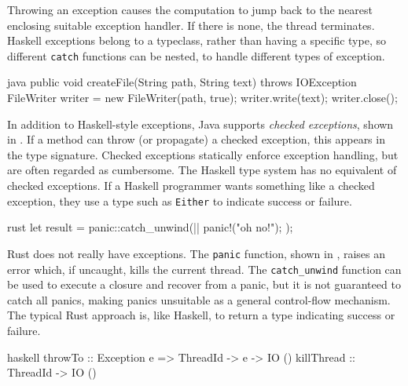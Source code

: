 Throwing an exception causes the computation to jump back to the
nearest enclosing suitable exception handler.  If there is none, the
thread terminates.  Haskell exceptions belong to a typeclass, rather
than having a specific type, so different \verb|catch| functions can
be nested, to handle different types of exception.

\begin{listing}
\centering
\begin{cminted}{java}
public void createFile(String path, String text) throws IOException {
  FileWriter writer = new FileWriter(path, true);
  writer.write(text);
  writer.close();
}
\end{cminted}
\caption{Checked exceptions in Java.}\label{lst:excs_java}
\end{listing}

In addition to Haskell-style exceptions, Java supports \emph{checked
  exceptions}, shown in .  If a method can throw
(or propagate) a checked exception, this appears in the type
signature.  Checked exceptions statically enforce exception handling,
but are often regarded as cumbersome.  The Haskell type system has no
equivalent of checked exceptions.  If a Haskell programmer wants
something like a checked exception, they use a type such as
\verb|Either| to indicate success or failure.

\begin{listing}
\centering
\begin{cminted}{rust}
let result = panic::catch_unwind(|| {
    panic!("oh no!");
});
\end{cminted}
\caption{Panics in Rust.}\label{lst:excs_rust}
\end{listing}

Rust does not really have exceptions.  The \verb|panic| function,
shown in , raises an error which, if uncaught,
kills the current thread.  The \verb|catch_unwind| function can be
used to execute a closure and recover from a panic, but it is not
guaranteed to catch all panics\cite{rust2018}, making panics
unsuitable as a general control-flow mechanism.  The typical Rust
approach is, like Haskell, to return a type indicating success or
failure.

\begin{listing}
\centering
\begin{cminted}{haskell}
throwTo    :: Exception e => ThreadId -> e -> IO ()
killThread :: ThreadId -> IO ()
\end{cminted}
\caption{Asynchronous exceptions in Haskell.}\label{lst:excsa_haskell}
\end{listing}

